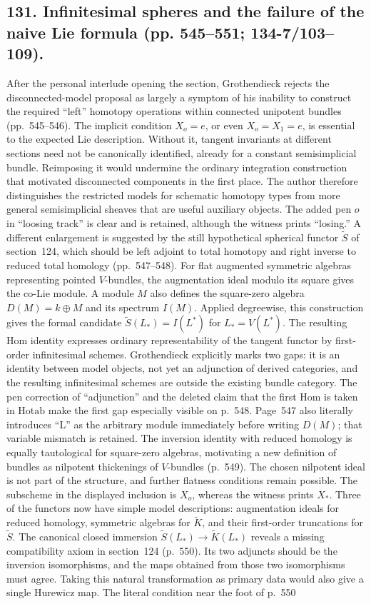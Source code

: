 \documentclass[10pt,oneside]{book}
\begin{document}
\subsection*{131. Infinitesimal spheres and the failure of the naive Lie formula (pp. 545--551; 134-7/103--109).}
After the personal interlude opening the section, Grothendieck rejects the disconnected-model proposal as largely a symptom of his inability to construct the required ``left'' homotopy operations within connected unipotent bundles (pp.~545--546). The implicit condition $X_o=e$, or even $X_o=X_1=e$, is essential to the expected Lie description. Without it, tangent invariants at different sections need not be canonically identified, already for a constant semisimplicial bundle. Reimposing it would undermine the ordinary integration construction that motivated disconnected components in the first place. The author therefore distinguishes the restricted models for schematic homotopy types from more general semisimplicial sheaves that are useful auxiliary objects. The added pen $o$ in ``loosing track'' is clear and is retained, although the witness prints ``losing.'' A different enlargement is suggested by the still hypothetical spherical functor $\widetilde S$ of section~124, which should be left adjoint to total homotopy and right inverse to reduced total homology (pp.~547--548). For flat augmented symmetric algebras representing pointed $V$-bundles, the augmentation ideal modulo its square gives the co-Lie module. A module $M$ also defines the square-zero algebra $D(M)=k\oplus M$ and its spectrum $I(M)$. Applied degreewise, this construction gives the formal candidate $\widetilde S(L_*)=I(L^*)$ for $L_*=V(L^*)$. The resulting Hom identity expresses ordinary representability of the tangent functor by first-order infinitesimal schemes. Grothendieck explicitly marks two gaps: it is an identity between model objects, not yet an adjunction of derived categories, and the resulting infinitesimal schemes are outside the existing bundle category. The pen correction of ``adjunction'' and the deleted claim that the first Hom is taken in $\mathrm{Hotab}$ make the first gap especially visible on p.~548. Page~547 also literally introduces ``L'' as the arbitrary module immediately before writing $D(M)$; that variable mismatch is retained. The inversion identity with reduced homology is equally tautological for square-zero algebras, motivating a new definition of bundles as nilpotent thickenings of $V$-bundles (p.~549). The chosen nilpotent ideal is not part of the structure, and further flatness conditions remain possible. The subscheme in the displayed inclusion is $X_o$, whereas the witness prints $X_*$. Three of the functors now have simple model descriptions: augmentation ideals for reduced homology, symmetric algebras for $\widetilde K$, and their first-order truncations for $\widetilde S$. The canonical closed immersion $\widetilde S(L_*)\to\widetilde K(L_*)$ reveals a missing compatibility axiom in section~124 (p.~550). Its two adjuncts should be the inversion isomorphisms, and the maps obtained from those two isomorphisms must agree. Taking this natural transformation as primary data would also give a single Hurewicz map. The literal condition near the foot of p.~550 
\end{document}
